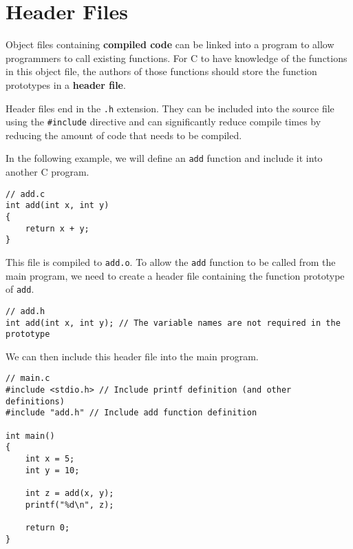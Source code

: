 \documentclass[a4paper]{report}
\begin{document}
\section{Header Files}
Object files containing \textbf{compiled code} can be linked into a
program to allow programmers to call existing functions. For C to have
knowledge of the functions in this object file, the authors of those
functions should store the function prototypes in a \textbf{header
file}.

Header files end in the \texttt{.h} extension. They can be
included into the source file using the \texttt{#include}
directive and can significantly reduce compile times by reducing the
amount of code that needs to be compiled.

In the following example, we will define an \texttt{add}
function and include it into another C program.
\begin{verbatim}
// add.c
int add(int x, int y)
{
    return x + y;
}
\end{verbatim}
This file is compiled to \texttt{add.o}. To allow the
\texttt{add} function to be called from the main program, we
need to create a header file containing the function prototype of
\texttt{add}.
\begin{verbatim}
// add.h
int add(int x, int y); // The variable names are not required in the prototype
\end{verbatim}
We can then include this header file into the main program.
\begin{verbatim}
// main.c
#include <stdio.h> // Include printf definition (and other definitions)
#include "add.h" // Include add function definition

int main()
{
    int x = 5;
    int y = 10;

    int z = add(x, y);
    printf("%d\n", z);

    return 0;
}
\end{verbatim}
\end{document}
